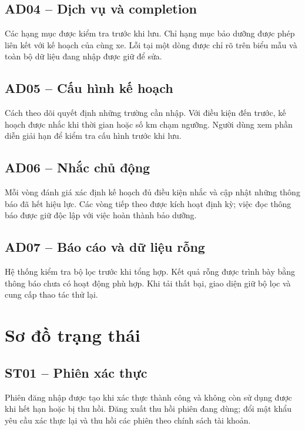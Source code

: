 \subsection{AD04 -- Dịch vụ và completion}
Các hạng mục được kiểm tra trước khi lưu. Chỉ hạng mục bảo dưỡng được phép liên kết với kế hoạch của cùng xe. Lỗi tại một dòng được chỉ rõ trên biểu mẫu và toàn bộ dữ liệu đang nhập được giữ để sửa.

\subsection{AD05 -- Cấu hình kế hoạch}
Cách theo dõi quyết định những trường cần nhập. Với điều kiện đến trước, kế hoạch được nhắc khi thời gian hoặc số km chạm ngưỡng. Người dùng xem phần diễn giải hạn để kiểm tra cấu hình trước khi lưu.

\subsection{AD06 -- Nhắc chủ động}
Mỗi vòng đánh giá xác định kế hoạch đủ điều kiện nhắc và cập nhật những thông báo đã hết hiệu lực. Các vòng tiếp theo được kích hoạt định kỳ; việc đọc thông báo được giữ độc lập với việc hoàn thành bảo dưỡng.

\subsection{AD07 -- Báo cáo và dữ liệu rỗng}
Hệ thống kiểm tra bộ lọc trước khi tổng hợp. Kết quả rỗng được trình bày bằng thông báo chưa có hoạt động phù hợp. Khi tải thất bại, giao diện giữ bộ lọc và cung cấp thao tác thử lại.

\section{Sơ đồ trạng thái}
\subsection{ST01 -- Phiên xác thực}
Phiên đăng nhập được tạo khi xác thực thành công và không còn sử dụng được khi hết hạn hoặc bị thu hồi. Đăng xuất thu hồi phiên đang dùng; đổi mật khẩu yêu cầu xác thực lại và thu hồi các phiên theo chính sách tài khoản.

